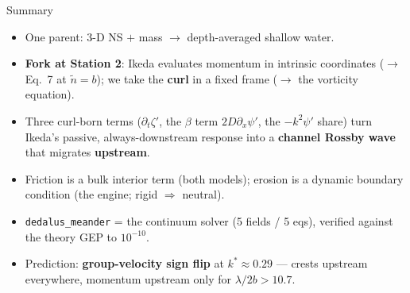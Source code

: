 \documentclass[aspectratio=169,10pt]{beamer}
\newcommand{\hl}[2]{\textcolor{#1}{\textbf{#2}}}
\newcommand{\pp}{\psi'}
\newcommand{\zp}{\zeta'}
\newcommand{\dt}{\partial_t}
\newcommand{\dx}{\partial_x}
\begin{document}
\begin{frame}{Summary}
\begin{itemize}
  \item One parent: 3-D NS $+$ mass $\to$ depth-averaged shallow water.
  \item \hl{cEros}{Fork at Station 2}: Ikeda evaluates momentum in intrinsic
        coordinates ($\to$ Eq.~7 at $\tilde n=b$); we take the \hl{cCurv}{curl} in a
        fixed frame ($\to$ the vorticity equation).
  \item Three curl-born terms ($\dt\zp$, the $\beta$ term $2D\dx\pp$, the $-k^2\pp$
        share) turn Ikeda's passive, always-downstream response into a
        \hl{cChannel}{channel Rossby wave} that migrates \hl{cCurv}{upstream}.
  \item Friction is a bulk interior term (both models); erosion is a dynamic
        boundary condition (the engine; rigid $\Rightarrow$ neutral).
  \item \texttt{dedalus\_meander} = the continuum solver (5 fields / 5 eqs),
        verified against the theory GEP to $10^{-10}$.
  \item Prediction: \hl{cVeloc}{group-velocity sign flip} at $k^*\!\approx\!0.29$ ---
        crests upstream everywhere, momentum upstream only for $\lambda/2b>10.7$.
\end{itemize}
\end{frame}
\end{document}
